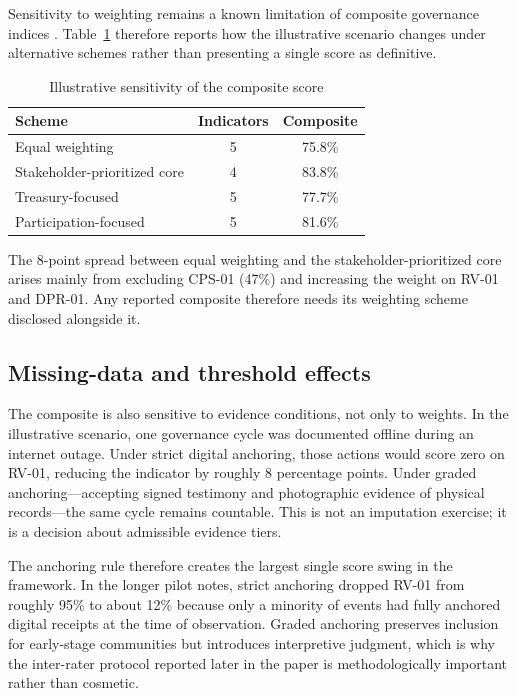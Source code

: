 \documentclass[sigconf]{acmart}
\begin{document}
Sensitivity to weighting remains a known limitation of composite governance indices \cite{langbein2010,oman2010}. Table~\ref{tab:sensitivity} therefore reports how the illustrative scenario changes under alternative schemes rather than presenting a single score as definitive.

\begin{table}[t]
\caption{Illustrative sensitivity of the composite score}
\label{tab:sensitivity}
\small
\begin{tabularx}{\columnwidth}{l c c}
\toprule
Scheme & Indicators & Composite \\
\midrule
Equal weighting & 5 & 75.8\% \\
Stakeholder-prioritized core & 4 & 83.8\% \\
Treasury-focused & 5 & 77.7\% \\
Participation-focused & 5 & 81.6\% \\
\bottomrule
\end{tabularx}
\end{table}

The 8-point spread between equal weighting and the stakeholder-prioritized core arises mainly from excluding CPS-01 (47\%) and increasing the weight on RV-01 and DPR-01. Any reported composite therefore needs its weighting scheme disclosed alongside it.

\subsection{Missing-data and threshold effects}

The composite is also sensitive to evidence conditions, not only to weights. In the illustrative scenario, one governance cycle was documented offline during an internet outage. Under strict digital anchoring, those actions would score zero on RV-01, reducing the indicator by roughly 8 percentage points. Under graded anchoring---accepting signed testimony and photographic evidence of physical records---the same cycle remains countable. This is not an imputation exercise; it is a decision about admissible evidence tiers.

The anchoring rule therefore creates the largest single score swing in the framework. In the longer pilot notes, strict anchoring dropped RV-01 from roughly 95\% to about 12\% because only a minority of events had fully anchored digital receipts at the time of observation. Graded anchoring preserves inclusion for early-stage communities but introduces interpretive judgment, which is why the inter-rater protocol reported later in the paper is methodologically important rather than cosmetic.
\end{document}
